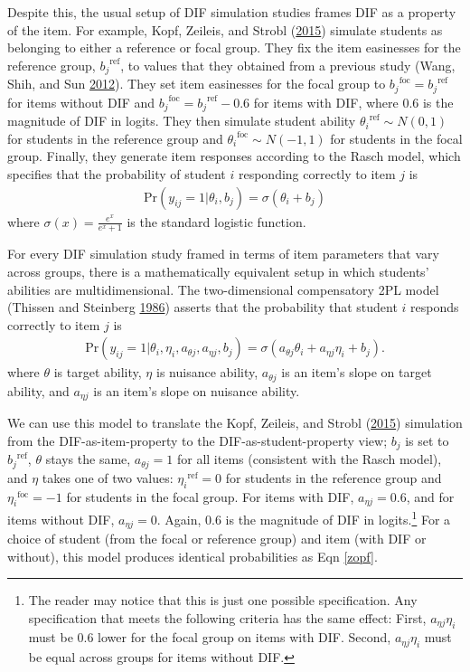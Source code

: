 \documentclass[
  11pt,
]{article}
\begin{document}
Despite this, the usual setup of DIF simulation studies frames DIF as a property of the item. For example, Kopf, Zeileis, and Strobl (\protect\hyperlink{ref-kopf2015framework}{2015}) simulate students as belonging to either a reference or focal group. They fix the item easinesses for the reference group, \({b_j}^{\text{ref}}\), to values that they obtained from a previous study (Wang, Shih, and Sun \protect\hyperlink{ref-wang2012dif}{2012}). They set item easinesses for the focal group to \({b_j}^{\text{foc}} = {b_j}^{\text{ref}}\) for items without DIF and \({b_j}^{\text{foc}} = {b_j}^{\text{ref}} - 0.6\) for items with DIF, where 0.6 is the magnitude of DIF in logits. They then simulate student ability \({\theta_i}^{\text{ref}} \sim N(0,1)\) for students in the reference group and \({\theta_i}^{\text{foc}} \sim N(-1,1)\) for students in the focal group. Finally, they generate item responses according to the Rasch model, which specifies that the probability of student \(i\) responding correctly to item \(j\) is
\begin{align}
\text{Pr}(y_{ij} = 1 | \theta_i, b_j) = \sigma(\theta_i + b_j) \label{zopf}
\end{align}
where \(\sigma(x) = \frac{e^x}{e^x + 1}\) is the standard logistic function.

For every DIF simulation study framed in terms of item parameters that vary across groups, there is a mathematically equivalent setup in which students' abilities are multidimensional. The two-dimensional compensatory 2PL model (Thissen and Steinberg \protect\hyperlink{ref-thissen1986taxonomy}{1986}) asserts that the probability that student \(i\) responds correctly to item \(j\) is
\begin{align}
\text{Pr}(y_{ij} = 1 | \theta_i, \eta_i, a_{\theta j}, a_{\eta j}, b_j) = \sigma(a_{\theta j}\theta_i + a_{\eta j}\eta_i + b_j).
\end{align}
where \(\theta\) is target ability, \(\eta\) is nuisance ability, \(a_{\theta j}\) is an item's slope on target ability, and \(a_{\eta j}\) is an item's slope on nuisance ability.

We can use this model to translate the Kopf, Zeileis, and Strobl (\protect\hyperlink{ref-kopf2015framework}{2015}) simulation from the DIF-as-item-property to the DIF-as-student-property view; \(b_j\) is set to \({b_j}^{\text{ref}}\), \(\theta\) stays the same, \(a_{\theta j} = 1\) for all items (consistent with the Rasch model), and \(\eta\) takes one of two values: \({\eta_i}^{\text{ref}} = 0\) for students in the reference group and \({\eta_i}^{\text{foc}} = -1\) for students in the focal group. For items with DIF, \(a_{\eta j} = 0.6\), and for items without DIF, \(a_{\eta j} = 0\). Again, 0.6 is the magnitude of DIF in logits.\footnote{The reader may notice that this is just one possible specification. Any specification that meets the following criteria has the same effect: First, \(a_{\eta j}\eta_i\) must be 0.6 lower for the focal group on items with DIF. Second, \(a_{\eta j}\eta_i\) must be equal across groups for items without DIF.} For a choice of student (from the focal or reference group) and item (with DIF or without), this model produces identical probabilities as Eqn \ref{zopf}.
\end{document}
